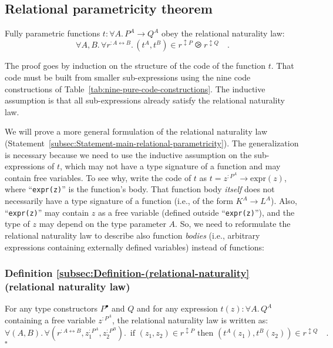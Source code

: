 \subsection{Relational parametricity theorem\label{subsec:Relational-parametricity-theorem} }

Fully parametric functions $t:\forall A.\,P^{A}\rightarrow Q^{A}$
obey the relational naturality law:
\[
\forall A,B.\,\forall r^{:A\leftrightarrow B}.\,(t^{A},t^{B})\in r^{\updownarrow P}\ogreaterthan r^{\updownarrow Q}\quad.
\]

The proof goes by induction on the structure of the code of the function
$t$. That code must be built from smaller sub-expressions using the
nine code constructions of Table~\ref{tab:nine-pure-code-constructions}.
The inductive assumption is that all sub-expressions already satisfy
the relational naturality law.

We will prove a more general formulation of the relational naturality
law (Statement~\ref{subsec:Statement-main-relational-parametricity}).
The generalization is necessary because we need to use the inductive
assumption on the sub-expressions of $t$, which may not have a type
signature of a function and may contain free variables. To see why,
write the code of $t$ as $t=z^{:P^{A}}\rightarrow\text{expr}(z)$,
 where \textsf{``}\lstinline!expr(z)!\textsf{''} is the function\textsf{'}s body. That function
body \emph{itself} does not necessarily have a type signature of a
function (i.e., of the form $K^{A}\rightarrow L^{A}$). Also, \textsf{``}\lstinline!expr(z)!\textsf{''}
may contain $z$ as a free variable (defined outside \textsf{``}\lstinline!expr(z)!\textsf{''}),
and the type of $z$ may depend on the type parameter $A$. So, we
need to reformulate the relational naturality law to describe also
function \emph{bodies} (i.e., arbitrary expressions containing externally
defined variables) instead of functions:

\subsubsection{Definition \label{subsec:Definition-(relational-naturality}\ref{subsec:Definition-(relational-naturality}
(relational naturality law)}

For any type constructors $P^{\bullet}$ and $Q$ and for any expression
$t(z):\forall A.\,Q^{A}$ containing a free variable $z^{:P^{A}}$,
the relational naturality law
is written as:
\begin{equation}
\forall(A,B).\,\forall(r^{:A\leftrightarrow B},z_{1}^{:P^{A}},z_{2}^{:P^{B}}).\,\text{ if }(z_{1},z_{2})\in r^{\updownarrow P}\text{ then }(t^{A}(z_{1}),t^{B}(z_{2}))\in r^{\updownarrow Q}\quad.\label{eq:relational-naturality-law}
\end{equation}
$\square$

